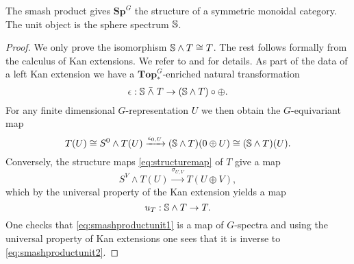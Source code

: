 \begin{prop}
The smash product gives $\mathbf{Sp}^G$ the structure of a symmetric monoidal
category. The unit object is the sphere spectrum $\mathbb{S}$.
\end{prop}

\begin{proof}
We only prove the isomorphism $\mathbb{S} \wedge T\cong T$. The rest
follows formally from the calculus of Kan extensions. We refer to \cite[Theorem~3.3, \pno~20]{day}
and \cite[Theorem~4.1, \pno~26]{day} for details. As part of the data of a
left Kan extension we have a $\mathbf{Top}_{\ast}^G$-enriched natural transformation
\[
\epsilon: \mathbb{S}\;\bar{\wedge}\;T\to (\mathbb{S}\wedge T)\circ \oplus.
\]
For any finite dimensional $G$-representation $U$ we then obtain the $G$-equivariant map
\begin{equation}\label{eq:smashproductunit1}
T(U)\cong S^0\wedge T(U)\xrightarrow{\epsilon_{0,U}} (\mathbb{S}\wedge T)(0\oplus U)
\cong (\mathbb{S}\wedge T)(U).
\end{equation}
Conversely, the structure maps \eqref{eq:structuremap} of $T$ give a map
\[
S^V\wedge T(U)\xrightarrow{\sigma_{U, V}} T(U\oplus V),
\]
which by the universal property of the Kan extension yields a map
\begin{equation}\label{eq:smashproductunit2}
u_T:\mathbb{S} \wedge T\to T.
\end{equation}
One checks that \eqref{eq:smashproductunit1} is a map of $G$-spectra and using
the universal property of Kan extensions one sees that it is inverse to
\eqref{eq:smashproductunit2}. 
\end{proof}


